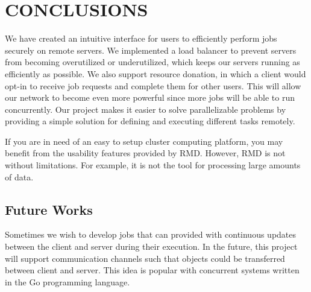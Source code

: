 \section{CONCLUSIONS}\label{sec:conclusions}

We have created an intuitive interface for users to efficiently
perform jobs securely on remote servers.
We implemented a load balancer to prevent servers from becoming
overutilized or underutilized, which keeps our servers running
as efficiently as possible.
We also support resource donation, in which a client would
opt-in to receive job requests and complete them for other users.
This will allow our network
to become even more powerful since more jobs will be able
to run concurrently.
Our project makes it easier to solve
parallelizable problems by providing a simple solution for
defining and executing different tasks remotely.

If you are in need of an easy to setup cluster computing
platform, you may benefit from the usability features
provided by RMD.
However, RMD is not without limitations.
For example, it is not the tool for processing
large amounts of data.


\subsection{Future Works}\label{subsec:futureWorks}

Sometimes we wish to develop jobs that can provided with
continuous updates between the client and server during their
execution.
In the future, this project will support communication
channels such that objects could be transferred between
client and server.
This idea is popular with concurrent systems written in
the Go programming language.

